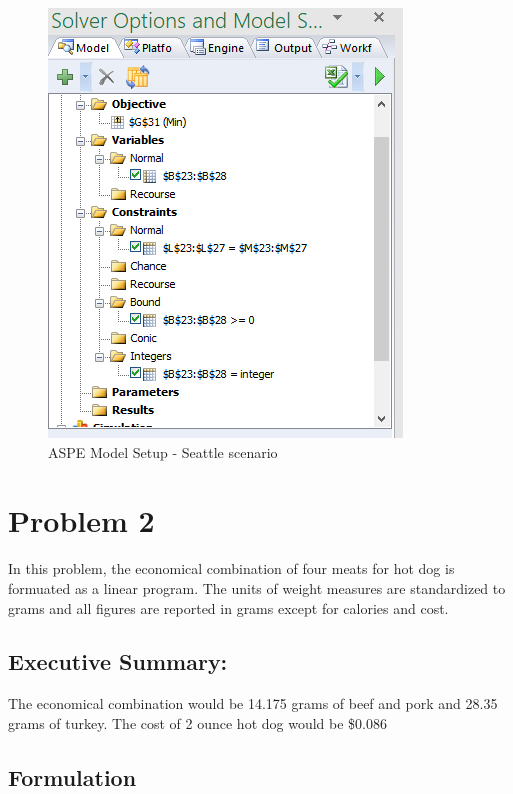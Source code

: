\documentclass[]{article}
\begin{document}
\begin{figure}[h]

{\centering \includegraphics{Figures/Homework3/modelp1b} 

}

\caption{ASPE Model Setup - Seattle scenario}\label{fig:unnamed-chunk-5}
\end{figure}

\pagebreak

\section{Problem 2}\label{problem-2}

In this problem, the economical combination of four meats for hot dog is
formuated as a linear program. The units of weight measures are
standardized to grams and all figures are reported in grams except for
calories and cost.

\subsection{Executive Summary:}\label{executive-summary-1}

The economical combination would be 14.175 grams of beef and pork and
28.35 grams of turkey. The cost of 2 ounce hot dog would be \$0.086

\subsection{Formulation}\label{formulation-1}
\end{document}
